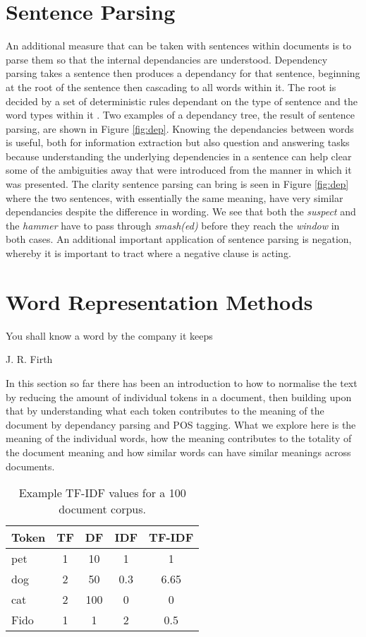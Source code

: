 \section{Sentence Parsing} An additional measure that can be taken with sentences within documents is to parse them so that the internal dependancies are understood. Dependency parsing takes a sentence then produces a dependancy for that sentence, beginning at the root of the sentence then cascading to all words within it.  The root is decided by a set of deterministic rules dependant on the type of sentence and the word types within it \parencite{eisenstein2018natural}.  Two examples of a dependancy tree, the result of sentence parsing, are shown in Figure  \ref{fig:dep}. Knowing the dependancies between words is useful, both for information extraction but also question and answering tasks because understanding the underlying dependencies in a sentence can help clear some of the ambiguities away that were introduced from the manner in which it was presented. The clarity sentence parsing can bring is seen in Figure \ref{fig:dep} where the two sentences, with essentially the same meaning, have very similar dependancies despite the difference in wording. We see that both the \emph{suspect} and the \emph{hammer} have to pass through \emph{smash(ed)} before they reach the \emph{window} in both cases. An additional important application of sentence parsing is negation, whereby it is important to tract where a negative clause is acting. 


\section{Word Representation Methods}


\epigraph{\centering You shall know a word by the company it keeps}{J. R. Firth}


In this section so far there has been an introduction to how to normalise the text by reducing the amount of individual tokens in a document, then building upon that by understanding what each token contributes to the meaning of the document by dependancy parsing and POS tagging. What we explore here is the meaning of the individual words, how the meaning contributes to the totality of the document meaning and how similar words can have similar meanings across documents. 

\begin{table}[]
\centering
\begin{tabular}{@{}lcccc@{}}
\toprule
\textbf{Token} & \multicolumn{1}{l}{\textbf{TF}} & \multicolumn{1}{l}{\textbf{DF}} & \multicolumn{1}{l}{\textbf{IDF}} & \multicolumn{1}{l}{\textbf{TF-IDF}} \\ \midrule
pet  & 1 & 10  & 1   & 1    \\
dog  & 2 & 50  & 0.3 & 6.65 \\
cat  & 2 & 100 & 0   & 0    \\
Fido & 1 & 1   & 2   & 0.5  \\ \bottomrule
\end{tabular}
\caption{\label{tab:search} Example TF-IDF values for a 100 document corpus.}
\end{table}


